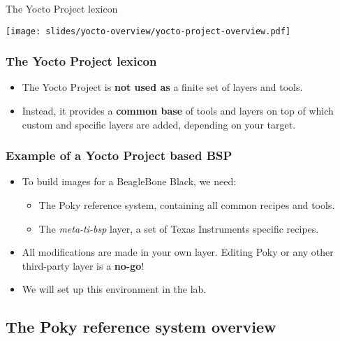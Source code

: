 \begin{frame}{The Yocto Project lexicon}
  \begin{center}
    \texttt{[image: slides/yocto-overview/yocto-project-overview.pdf]}
  \end{center}
\end{frame}

\begin{frame}
  \frametitle{The Yocto Project lexicon}
  \begin{itemize}
    \item The Yocto Project is \textbf{not used as} a finite set of
          layers and tools.
    \item Instead, it provides a \textbf{common base} of tools and
          layers on top of which custom and specific layers are added,
          depending on your target.
  \end{itemize}
\end{frame}

\begin{frame}
  \frametitle{Example of a Yocto Project based BSP}
  \begin{itemize}
    \item To build images for a BeagleBone Black, we need:
    \begin{itemize}
      \item The Poky reference system, containing all common recipes
            and tools.
      \item The {\em meta-ti-bsp} layer, a set of Texas Instruments
            specific recipes.
    \end{itemize}
    \item All modifications are made in your own layer.  Editing Poky or
      any other third-party layer is a \textbf{no-go}!
    \item We will set up this environment in the lab.
  \end{itemize}
\end{frame}

\subsection{The Poky reference system overview}

